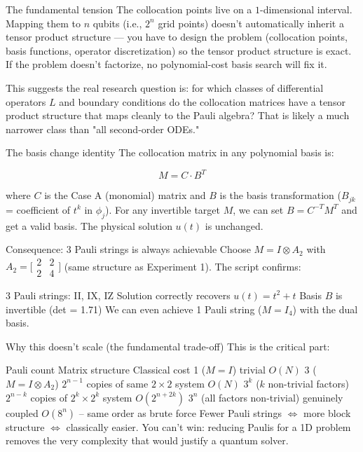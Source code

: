 \documentclass{article}
\begin{document}
The fundamental tension
The collocation points live on a $1$-dimensional interval. Mapping them to $n$ qubits (i.e., $2^n$ grid points) doesn't automatically inherit a tensor product structure — you have to design the problem (collocation points, basis functions, operator discretization) so the tensor product structure is exact. If the problem doesn't factorize, no polynomial-cost basis search will fix it.

This suggests the real research question is: for which classes of differential operators $L$ and boundary conditions do the collocation matrices have a tensor product structure that maps cleanly to the Pauli algebra? That is likely a much narrower class than "all second-order ODEs."

\noindent\makebox[\linewidth]{\rule{\paperwidth}{0.4pt}}


The basis change identity
The collocation matrix in any polynomial basis is:

$$M = C \cdot B^T$$

where $C$ is the Case A (monomial) matrix and $B$ is the basis transformation ($B_{jk}$ = coefficient of $t^k$ in $\phi_j$). For any invertible target $M$, we can set $B = C^{-T} M^T$ and get a valid basis. The physical solution $u(t)$ is unchanged.

Consequence: 3 Pauli strings is always achievable
Choose $M = I \otimes A_2$ with $A_2 = \bigl[\begin{smallmatrix}2&2\\2&4\end{smallmatrix}\bigr]$ (same structure as Experiment 1). The script confirms:

3 Pauli strings: II, IX, IZ
Solution correctly recovers $u(t) = t^2 + t$
Basis $B$ is invertible (det = 1.71)
We can even achieve 1 Pauli string ($M = I_4$) with the dual basis.

Why this doesn't scale (the fundamental trade-off)
This is the critical part:

Pauli count	Matrix structure	Classical cost
1 ($M = I$)	trivial	$O(N)$
3 ($M = I \otimes A_2$)	$2^{n-1}$ copies of same $2{\times}2$ system	$O(N)$
$3^k$ ($k$ non-trivial factors)	$2^{n-k}$ copies of $2^k{\times}2^k$ system	$O(2^{n+2k})$
$3^n$ (all factors non-trivial)	genuinely coupled	$O(8^n)$ -- same order as brute force
Fewer Pauli strings $\Leftrightarrow$ more block structure $\Leftrightarrow$ classically easier. You can't win: reducing Paulis for a 1D problem removes the very complexity that would justify a quantum solver.
\end{document}
